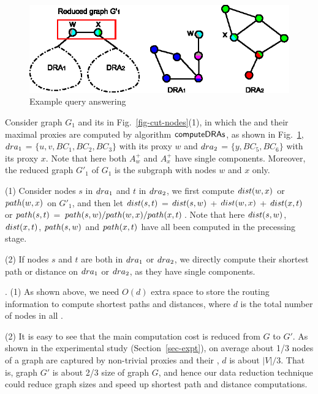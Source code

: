 \begin{figure}[tb!]
\begin{center}
\includegraphics[scale=0.9]{./Example-framework.eps}
\end{center}
\vspace{-2ex}
\caption{Example query answering}
  \label{fig-query-answering}\vspace{-3ex}
\end{figure}

\begin{example}
\label{exm-query}
Consider graph $G_1$ and its \bccs in Fig.~\ref{fig-cut-nodes}(1), in which the \dras and their maximal proxies are computed by algorithm ${\mathsf{computeDRAs}}$, as shown in Fig.~\ref{fig-query-answering}, \ie\ ${\sc dra}_1$ = $\{u, v, BC_1, BC_2, BC_3\}$ with its proxy $w$ and ${\sc dra}_2$ = $\{y, BC_5, BC_6\}$ with its proxy $x$. Note that here both $A^{+}_w$ and $A^{+}_x$ have single components. Moreover, the reduced graph $G'_1$ of $G_1$  is the subgraph with nodes $w$ and $x$ only.




\sstab(1) Consider nodes $s$ in ${\sc dra}_1$  and $t$ in ${\sc dra}_2$, we first compute $\dist(w, x)$ or $\path(w,x)$ on $G'_1$, and then 
let $\dist(s, t)$ = $\dist(s, w)$ + $\dist(w, x)$ + $\dist(x, t)$ or $\path(s, t)$ = $\path(s, w)/\path(w, x)/\path(x, t)$.
Note that here $\dist(s, w)$, $\dist(x, t)$, $\path(s, w)$ and $\path(x, t)$ have all been computed in the precessing stage.


\sstab(2) If nodes $s$ and $t$ are both in ${\sc dra}_1$  or ${\sc dra}_2$, we directly compute their shortest path or distance on  ${\sc dra}_1$  or ${\sc dra}_2$,
as they have single components.
\end{example}

\vspace{-1ex}
.
(1) As shown above, we need $O(d)$ extra space to store the routing information to compute shortest paths and distances, where $d$ is the total number of nodes in all \dras.

\sstab (2) It is easy to see that the main computation cost is reduced from $G$ to $G'$. As shown in the experimental study (Section~\ref{sec-expt}), on average about 1/3 nodes of a graph are captured by non-trivial proxies and their \dras, \ie $d$ is about $|V|/3$. That is, graph $G'$ is about 2/3 size of graph $G$, and hence our data reduction technique could reduce graph sizes and speed up shortest path and distance computations. 